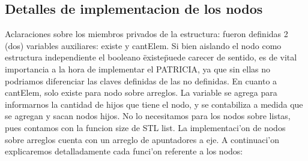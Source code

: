 \subsection{Detalles de implementacion de los nodos}
Aclaraciones sobre los miembros privados de la estructura: fueron definidas 2 (dos) variables auxiliares: existe y cantElem. Si bien aislando el nodo como estructura independiente el booleano \"existe\" puede carecer de sentido, es de vital importancia a la hora de implementar el PATRICIA, ya que sin ellas no podriamos diferenciar las claves definidas de las no definidas. En cuanto a cantElem, solo existe para nodo sobre arreglos. La variable se agrega para informarnos la cantidad de hijos que tiene el nodo, y se contabiliza a medida que se agregan y sacan nodos hijos. No lo necesitamos para los nodos sobre listas, pues contamos con la funcion size de STL list.
La implementaci'on de nodos sobre arreglos cuenta con un arreglo de apuntadores a eje.
A continuaci'on explicaremos detalladamente cada funci'on referente a los nodos:
